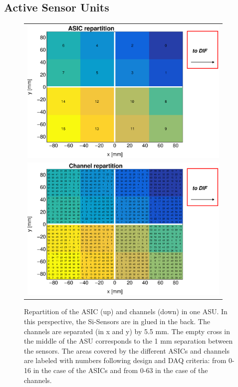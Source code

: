 \documentclass[a4paper,11pt]{article}
\begin{document}
\subsection{Active Sensor Units}
\label{sec:ASU}

\begin{figure}[!t]
  \centering
  \begin{tabular}{l}
    \includegraphics[width=4in]{../figs/ASU_geometry1.eps}  \\
    \includegraphics[width=4in]{../figs/ASU_geometry2.eps}  \\
  \end{tabular}
  \caption{Repartition of the ASIC (up) and channels (down) in one ASU. In this perspective, the Si-Sensors are in glued in the back.
    The channels are separated (in x and y) by 5.5 mm.
    The empty cross in the middle of the ASU corresponds to the 1 mm separation between the sensors.
    The areas covered by the different ASICs and channels
    are labeled with numbers following design and DAQ criteria: from 0-16 in the case of the ASICs and from 0-63 in the case of the channels.
  }
\label{ASU}
\end{figure}
\end{document}
